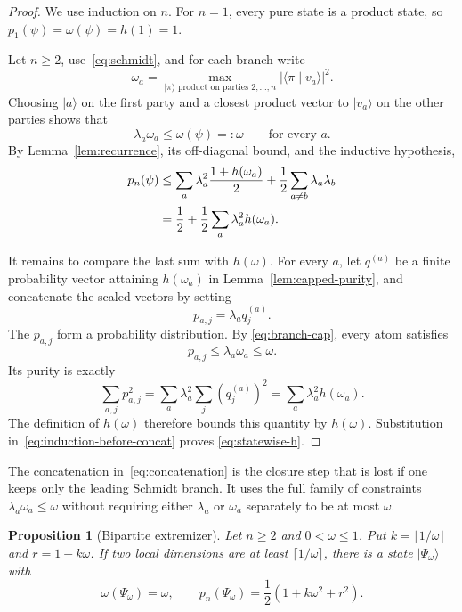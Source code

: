 \documentclass[11pt]{article}
\newtheorem{proposition}[theorem]{Proposition}
\theoremstyle{definition}
\theoremstyle{remark}
\newcommand{\ket}[1]{\lvert #1\rangle}
\newcommand{\braket}[2]{\langle #1\mid #2\rangle}
\begin{document}
\begin{proof}
We use induction on $n$.  For $n=1$, every pure state is a product state,
so $p_1(\psi)=\omega(\psi)=h(1)=1$.

Let $n\geq2$, use~\eqref{eq:schmidt}, and for each branch write
\[
  \omega_a
  =\max_{\ket\pi\text{ product on parties }2,\ldots,n}
       |\braket{\pi}{v_a}|^2.
\]
Choosing $\ket a$ on the first party and a closest product vector to
$\ket{v_a}$ on the other parties shows that
\begin{equation}\label{eq:branch-cap}
  \lambda_a\omega_a\leq\omega(\psi)=:\omega
  \qquad\text{for every }a.
\end{equation}
By Lemma~\ref{lem:recurrence}, its off-diagonal bound, and the inductive
hypothesis,
\begin{align}
  p_n(\psi)
  &\leq
    \sum_a\lambda_a^2\frac{1+h(\omega_a)}{2}
    +\frac12\sum_{a\neq b}\lambda_a\lambda_b \notag\\
  &=\frac12+\frac12\sum_a\lambda_a^2h(\omega_a).
  \label{eq:induction-before-concat}
\end{align}

It remains to compare the last sum with $h(\omega)$.  For every $a$, let
$q^{(a)}$ be a finite probability vector attaining $h(\omega_a)$ in
Lemma~\ref{lem:capped-purity}, and concatenate the scaled vectors by setting
\begin{equation}\label{eq:concatenation}
  p_{a,j}=\lambda_a q_j^{(a)}.
\end{equation}
The $p_{a,j}$ form a probability distribution.  By
\eqref{eq:branch-cap}, every atom satisfies
\[
  p_{a,j}\leq\lambda_a\omega_a\leq\omega.
\]
Its purity is exactly
\[
  \sum_{a,j}p_{a,j}^2
  =\sum_a\lambda_a^2\sum_j(q_j^{(a)})^2
  =\sum_a\lambda_a^2h(\omega_a).
\]
The definition of $h(\omega)$ therefore bounds this quantity by
$h(\omega)$.  Substitution in~\eqref{eq:induction-before-concat} proves
\eqref{eq:statewise-h}.
\end{proof}

The concatenation in~\eqref{eq:concatenation} is the closure step that is
lost if one keeps only the leading Schmidt branch.  It uses the full family
of constraints $\lambda_a\omega_a\leq\omega$ without requiring either
$\lambda_a$ or $\omega_a$ separately to be at most $\omega$.

\begin{proposition}[Bipartite extremizer]\label{prop:lower}
Let $n\geq2$ and $0<\omega\leq1$.  Put
$k=\lfloor1/\omega\rfloor$ and $r=1-k\omega$.  If two local dimensions are
at least $\lceil1/\omega\rceil$, there is a state $\ket{\Psi_\omega}$ with
\begin{equation}\label{eq:lower-properties}
  \omega(\Psi_\omega)=\omega,
  \qquad
  p_n(\Psi_\omega)=\frac12(1+k\omega^2+r^2).
\end{equation}
\end{proposition}
\end{document}
